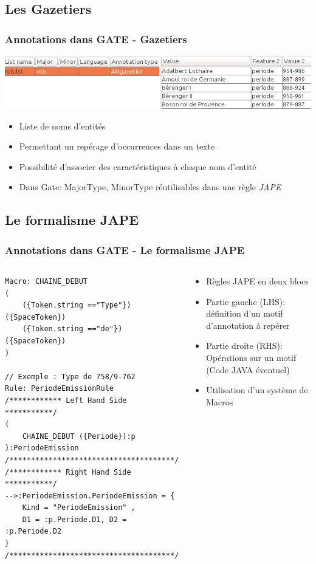 \documentclass[10pt, compress]{beamer}
\begin{document}
\subsection{Les Gazetiers}
\begin{frame}[fragile]
\frametitle{Annotations dans GATE - Gazetiers}
	\includegraphics[scale=0.4]{img/gazetier.png} 
		\begin{itemize}[<+->]
			\item{Liste de noms d'entités}
			\item{Permettant un repérage d’occurrences dans un texte}
			\item{Possibilité d'associer des caractéristiques à chaque nom d'entité}
			\item{Dans Gate: MajorType, MinorType réutilisables dans une règle \textit{JAPE}}
		\end{itemize}
\end{frame}

\subsection{Le formalisme JAPE}
\begin{frame}[fragile]
\frametitle{Annotations dans GATE - Le formalisme JAPE}
\begin{columns}
	\begin{scriptsize}
\begin{lstlisting}
Macro: CHAINE_DEBUT
(
    ({Token.string =="Type"})({SpaceToken})
    ({Token.string =="de"})({SpaceToken})
)

// Exemple : Type de 758/9-762
Rule: PeriodeEmissionRule
/************ Left Hand Side ***********/
(
    CHAINE_DEBUT ({Periode}):p
):PeriodeEmission
/**************************************/
/************ Right Hand Side ***********/
-->:PeriodeEmission.PeriodeEmission = {
 	Kind = "PeriodeEmission" ,
 	D1 = :p.Periode.D1, D2 = :p.Periode.D2
}
/**************************************/
\end{lstlisting}
\end{scriptsize}
	\begin{scriptsize}
	\begin{itemize}
	[square]
	\item{Règles JAPE en deux blocs}
	\item{Partie gauche (LHS): définition d'un motif d'annotation à repérer}
	\item{Partie droite (RHS): Opérations sur un motif (Code JAVA éventuel)}
	\item{Utilisation d'un système de Macros}
	\end{itemize}
	\end{scriptsize}
\end{columns}
\end{frame}
\end{document}
